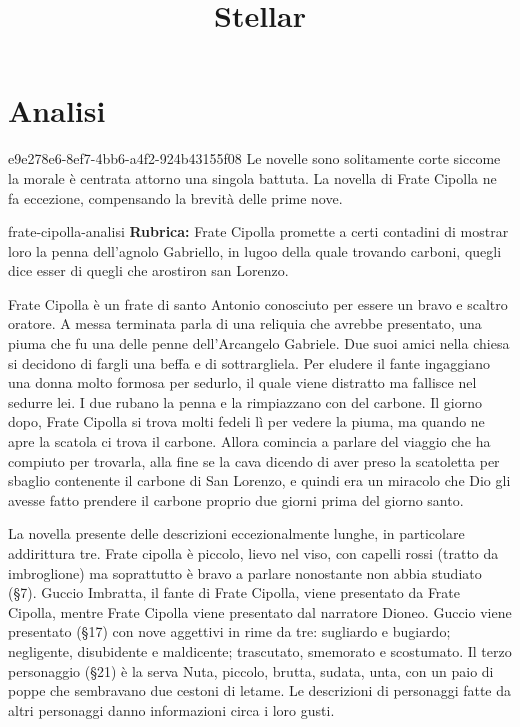 \documentclass[preview]{standalone}
\begin{document}
\title{Stellar}
\genpage

\section{Analisi}

\begin{snippetnote}{e9e278e6-8ef7-4bb6-a4f2-924b43155f08}{}
    Le novelle sono solitamente corte siccome la morale è centrata attorno una singola battuta.
    La novella di Frate Cipolla ne fa eccezione, compensando la brevità delle prime nove.
\end{snippetnote}

\begin{snippet}{frate-cipolla-analisi}
    \textbf{Rubrica:} Frate Cipolla promette a certi contadini di mostrar loro la penna dell'agnolo Gabriello, in lugoo della quale trovando carboni, quegli dice esser di quegli che arostiron san Lorenzo.

    Frate Cipolla è un frate di santo Antonio conosciuto per essere un bravo e scaltro oratore.
    A messa terminata parla di una reliquia che avrebbe presentato, una piuma che fu una delle penne dell'Arcangelo Gabriele.
    Due suoi amici nella chiesa si decidono di fargli una beffa e di sottrargliela.
    Per eludere il fante ingaggiano una donna molto formosa per sedurlo, il quale viene distratto ma fallisce nel sedurre lei.
    I due rubano la penna e la rimpiazzano con del carbone.
    Il giorno dopo, Frate Cipolla si trova molti fedeli lì per vedere la piuma, ma quando ne apre la scatola
    ci trova il carbone. Allora comincia a parlare del viaggio che ha compiuto per trovarla,
    alla fine se la cava dicendo di aver preso la scatoletta per sbaglio contenente il carbone di San Lorenzo,
    e quindi era un miracolo che Dio gli avesse fatto prendere il carbone proprio due giorni prima del giorno santo.
    
    
    La novella presente delle descrizioni eccezionalmente lunghe, in particolare addirittura tre.
    Frate cipolla è piccolo, lievo nel viso, con capelli rossi (tratto da imbroglione) ma
    soprattutto è bravo a parlare nonostante non abbia studiato (§7).
    Guccio Imbratta, il fante di Frate Cipolla, viene presentato da Frate Cipolla,
    mentre Frate Cipolla viene presentato dal narratore Dioneo.
    Guccio viene presentato (§17) con nove aggettivi in rime da tre:
    sugliardo e bugiardo; negligente, disubidente e maldicente; trascutato, smemorato e scostumato.
    Il terzo personaggio (§21) è la serva Nuta, piccolo, brutta, sudata, unta, con un paio di poppe che sembravano due
    cestoni di letame.
    Le descrizioni di personaggi fatte da altri personaggi danno informazioni circa i loro gusti.
    

\end{snippet}
\end{document}
